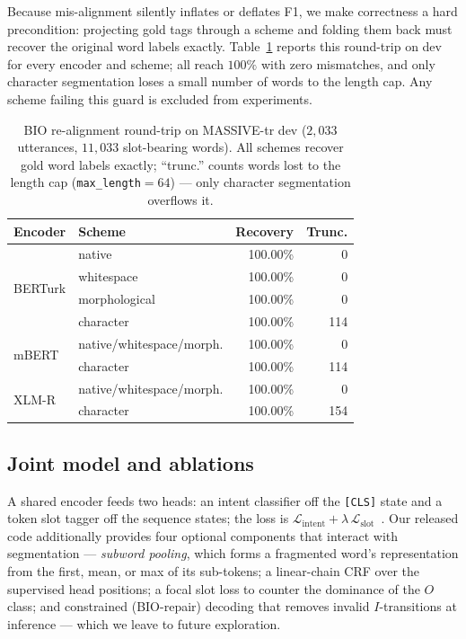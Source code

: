 \documentclass[runningheads]{llncs}
\begin{document}
Because mis-alignment silently inflates or deflates F1, we make correctness a hard
precondition: projecting gold tags through a scheme and folding them back must
recover the original word labels exactly. Table~\ref{tab:align} reports this
round-trip on dev for every encoder and scheme; all reach $100\%$ with zero
mismatches, and only character segmentation loses a small number of words to the
length cap. Any scheme failing this guard is excluded from experiments.

\begin{table}[t]
\centering
\caption{BIO re-alignment round-trip on MASSIVE-tr dev ($2{,}033$ utterances,
$11{,}033$ slot-bearing words). All schemes recover gold word labels exactly;
``trunc.'' counts words lost to the length cap (\texttt{max\_length}$=64$) ---
only character segmentation overflows it.}
\label{tab:align}
\begin{tabular}{llrr}
\toprule
Encoder & Scheme & Recovery & Trunc. \\
\midrule
\multirow{4}{*}{BERTurk}
 & native        & 100.00\% & 0 \\
 & whitespace    & 100.00\% & 0 \\
 & morphological & 100.00\% & 0 \\
 & character     & 100.00\% & 114 \\
\midrule
\multirow{2}{*}{mBERT}
 & native/whitespace/morph. & 100.00\% & 0 \\
 & character     & 100.00\% & 114 \\
\midrule
\multirow{2}{*}{XLM-R}
 & native/whitespace/morph. & 100.00\% & 0 \\
 & character     & 100.00\% & 154 \\
\bottomrule
\end{tabular}
\end{table}

\subsection{Joint model and ablations}
A shared encoder feeds two heads: an intent classifier off the \texttt{[CLS]}
state and a token slot tagger off the sequence states; the loss is
$\mathcal{L}_{\text{intent}}+\lambda\,\mathcal{L}_{\text{slot}}$~\cite{chen2019bert}.
Our released code additionally provides four optional components that interact
with segmentation --- \emph{subword pooling}, which forms a fragmented word's
representation from the first, mean, or max of its sub-tokens; a linear-chain CRF
over the supervised head positions; a focal slot loss to counter the dominance of
the $O$ class; and constrained (BIO-repair) decoding that removes invalid
$I$-transitions at inference --- which we leave to future exploration.
\end{document}
